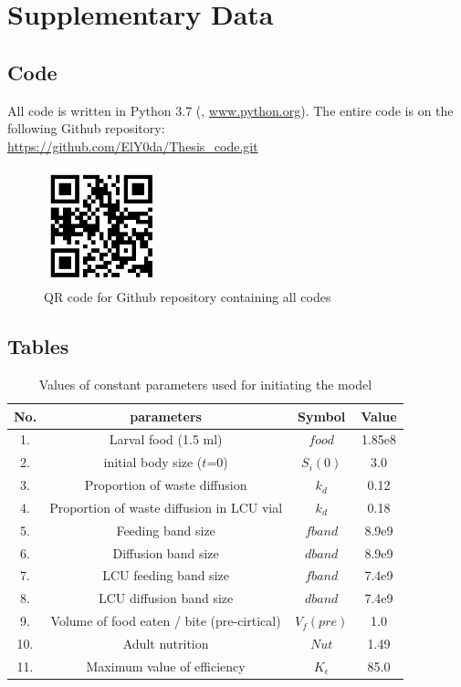 \chapter{Supplementary Data}
\section{Code}
All code is written in Python 3.7 (\citeauthor{WelcomePythonOrg}, \url{www.python.org}).
The entire code is on the following Github repository:\\
\url{https://github.com/ElY0da/Thesis_code.git}
\begin{figure}[h]
  \centering
  \includegraphics[width=0.3\textwidth]{CA1/github_code}
  \caption{QR code for Github repository containing all codes}
\end{figure}
\clearpage

\section{Tables}
\begin{table}[ht]
  \centering
  \begin{tabular}{|c|c|c|c|}
    \hline
    \textbf{No.} & \textbf{parameters} & \textbf{Symbol} & \textbf{Value} \\
    \hline
    1. & Larval food (1.5 ml) & $food$ & 1.85e8 \\
    \hline
    2. & initial body size ($t$=0) & $S_{i}(0)$ & 3.0 \\
    \hline
    3. & Proportion of waste diffusion & $k_{d}$ & 0.12 \\
    \hline
    4. & Proportion of waste diffusion in LCU vial & $k_{d}$ & 0.18 \\
    \hline
    5. & Feeding band size & $fband$ & 8.9e9 \\
    \hline
    6. & Diffusion band size & $dband$ & 8.9e9 \\
    \hline
    7. & LCU feeding band size & $fband$ & 7.4e9 \\
    \hline
    8. & LCU diffusion band size & $dband$ & 7.4e9 \\
    \hline
    9. & Volume of food eaten / bite (pre-cirtical) & $V_{f}(pre)$ & 1.0 \\
    \hline
    10. & Adult nutrition & $Nut$ & 1.49 \\
    \hline
    11. & Maximum value of efficiency & $K_{\epsilon}$ & 85.0 \\
    \hline
  \end{tabular}
  \caption{Values of constant parameters used for initiating the model}
  \label{tab:food_param}
\end{table}

